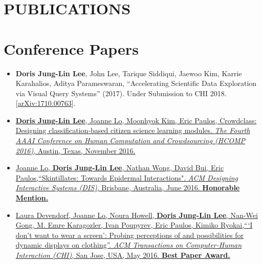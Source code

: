 \documentclass{res}
\begin{document}
\begin{resume}
\section{PUBLICATIONS}
\vspace{-5pt}
\section{Conference Papers}
\begin{itemize}
\item \textbf{Doris Jung-Lin Lee}, John Lee, Tarique Siddiqui, Jaewoo Kim, Karrie Karahalios, Aditya Parameswaran, ``Accelerating Scientific Data Exploration via Visual Query Systems'' (2017). Under Submission to CHI 2018. [\href{https://arxiv.org/abs/1710.00763}{arXiv:1710.00763}].  
\item \href{http://aaai.org/ocs/index.php/HCOMP/HCOMP16/paper/viewFile/14027/13638}{\textbf{Doris Jung-Lin Lee}, Joanne Lo, Moonhyok Kim, Eric Paulos, Crowdclass: Designing classification-based citizen science learning modules. \textit{The Fourth AAAI Conference on Human Computation and Crowdsourcing (HCOMP 2016)}, Austin, Texas, November 2016.}
\item \href{http://dl.acm.org/citation.cfm?id=2901885&CFID=765226474&CFTOKEN=46922780}{Joanne Lo, \textbf{Doris Jung-Lin Lee}, Nathan Wong, David Bui, Eric Paulos,``Skintillates: Towards Epidermal Interactions".  \textit{ACM Designing Interactive Systems (DIS)}, Brisbane, Australia, June 2016. \textbf{Honorable Mention.}}
\item \href{http://dl.acm.org/citation.cfm?id=2858192&CFID=765226474&CFTOKEN=46922780}{Laura Devendorf, Joanne Lo, Noura Howell, \textbf{Doris Jung-Lin Lee}, Nan-Wei Gong, M. Emre Karagozler, Ivan  Poupyrev, Eric Paulos, Kimiko Ryokai,``\hspace{1pt}`I don't want to wear a screen': Probing perceptions of and  possibilities for dynamic displays on clothing''. \textit{ACM Transactions on Computer-Human Interaction (CHI)}, San Jose, USA, May 2016. \textbf{Best Paper Award.}}
\end{itemize}
\vspace{-10pt}

\end{resume}
\end{document}

